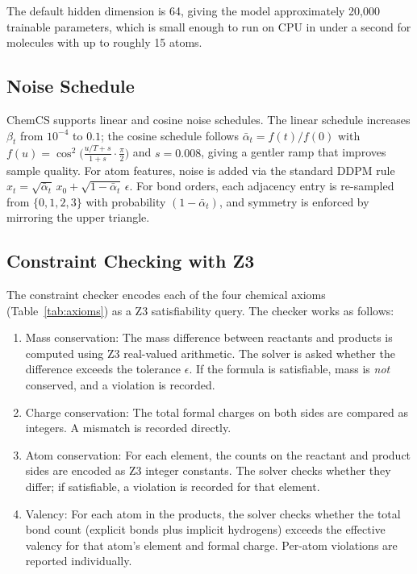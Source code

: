 \documentclass[11pt]{article}
\begin{document}
The default hidden dimension is 64, giving the model approximately
20,000 trainable parameters, which is small enough to run on CPU in
under a second for molecules with up to roughly 15 atoms.

\subsection{Noise Schedule}

ChemCS supports linear and cosine noise
schedules. The linear schedule increases $\beta_t$ from
$10^{-4}$ to $0.1$; the cosine schedule follows
$\bar\alpha_t = f(t)/f(0)$ with
$f(u) = \cos^2\!\bigl(\frac{u/T + s}{1+s}\cdot\frac{\pi}{2}\bigr)$
and $s = 0.008$, giving a gentler ramp that improves sample quality.
For atom features, noise is added via the standard DDPM rule
$x_t = \sqrt{\bar\alpha_t}\, x_0 + \sqrt{1-\bar\alpha_t}\, \epsilon$.
For bond orders, each adjacency entry is re-sampled from $\{0,1,2,3\}$
with probability $(1-\bar\alpha_t)$, and symmetry is enforced by
mirroring the upper triangle.

\subsection{Constraint Checking with Z3}

The constraint checker encodes each of the four chemical axioms
(Table~\ref{tab:axioms}) as a Z3 satisfiability query. The checker
works as follows:

\begin{enumerate}[nosep]
  \item Mass conservation: The mass difference between reactants and
        products is computed using Z3 real-valued arithmetic. The solver
        is asked whether the difference exceeds the
        tolerance $\epsilon$. If the formula is satisfiable, mass is
        \emph{not} conserved, and a violation is recorded.
  \item Charge conservation: The total formal charges on both sides are
        compared as integers. A mismatch is recorded directly.
  \item Atom conservation: For each element, the counts on the reactant
        and product sides are encoded as Z3 integer constants. The solver
        checks whether they differ; if satisfiable, a violation is
        recorded for that element.
  \item Valency: For each atom in the products, the solver checks
        whether the total bond count (explicit bonds plus implicit
        hydrogens) exceeds the effective valency for that atom's element
        and formal charge. Per-atom violations are reported individually.
\end{enumerate}
\end{document}
